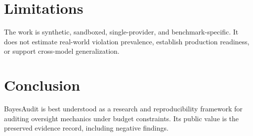 \documentclass{article}
\begin{document}
\section{Limitations}
The work is synthetic, sandboxed, single-provider, and benchmark-specific. It does not estimate real-world violation prevalence, establish production readiness, or support cross-model generalization.

\section{Conclusion}
BayesAudit is best understood as a research and reproducibility framework for auditing oversight mechanics under budget constraints. Its public value is the preserved evidence record, including negative findings.
\end{document}
